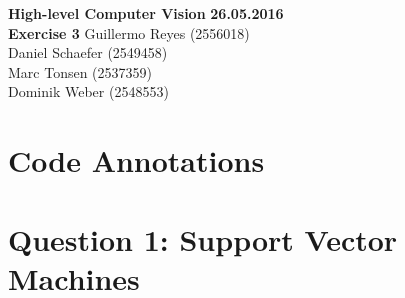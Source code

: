 \documentclass[12pt]{article}
\begin{document}

\noindent
{\Large \textbf{High-level Computer Vision}} \hfill \textbf{26.05.2016}\\
{\Large \textbf{Exercise 3}} 
\raggedleft \hfill Guillermo Reyes (2556018)\\
\hfill Daniel Schaefer (2549458)\\
\hfill Marc Tonsen (2537359)\\
\hfill Dominik Weber (2548553)\\

\raggedright


\section*{Code Annotations}




\section*{Question 1: Support Vector Machines}
\end{document}
